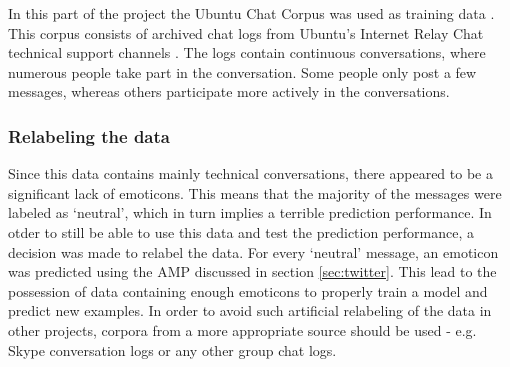 In this part of the project the Ubuntu Chat Corpus was used as training data . This corpus consists of archived chat logs from Ubuntu's Internet Relay Chat technical support channels . The logs contain continuous conversations, where numerous people take part in the conversation. Some people only post a few messages, whereas others participate more actively in the conversations. 

\subsubsection*{Relabeling the data} 
Since this data contains mainly technical conversations, there appeared to be a significant lack of emoticons. This means that the majority of the messages were labeled as `neutral', which in turn implies a terrible prediction performance. In otder to still be able to use this data and test the prediction performance, a decision was made to relabel the data. For every `neutral' message, an emoticon was predicted using the AMP discussed in section \ref{sec:twitter}. This lead to the possession of data containing enough emoticons to properly train a model and predict new examples. In order to avoid such artificial relabeling of the data in other projects, corpora from a more appropriate source should be used - e.g. Skype conversation logs or any other group chat logs.  
